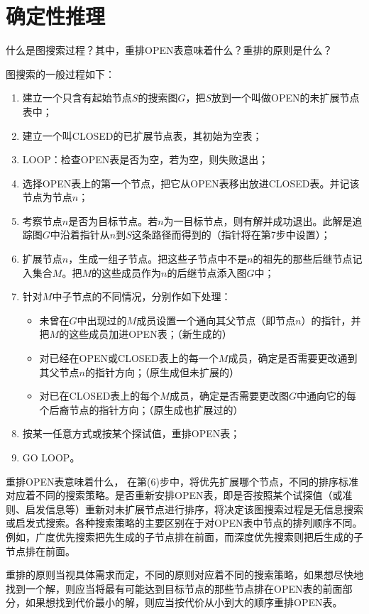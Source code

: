 \chapter{确定性推理}

\begin{question}
什么是图搜索过程？其中，重排OPEN表意味着什么？重排的原则是什么？
\end{question}	
\begin{solution}
图搜索的一般过程如下：
	\begin{enumerate}
		\item 建立一个只含有起始节点$S$的搜索图$G$，把$S$放到一个叫做OPEN的未扩展节点表中；
		\item 建立一个叫CLOSED的已扩展节点表，其初始为空表；
		\item LOOP：检查OPEN表是否为空，若为空，则失败退出；
		\item 选择OPEN表上的第一个节点，把它从OPEN表移出放进CLOSED表。并记该节点为节点$n$；
		\item 考察节点$n$是否为目标节点。若$n$为一目标节点，则有解并成功退出。此解是追踪图$G$中沿着指针从$n$到$S$这条路径而得到的（指针将在第7步中设置）；
		\item 扩展节点$n$，生成一组子节点。把这些子节点中不是$n$的祖先的那些后继节点记入集合$M$。把$M$的这些成员作为$n$的后继节点添入图$G$中；
		\item 针对$M$中子节点的不同情况，分别作如下处理：
			\begin{itemize}
				\item 未曾在$G$中出现过的$M$成员设置一个通向其父节点（即节点$n$）的指针，并把$M$的这些成员加进OPEN表；（新生成的）
				\item 对已经在OPEN或CLOSED表上的每一个$M$成员，确定是否需要更改通到其父节点$n$的指针方向；（原生成但未扩展的）
				\item 对已在CLOSED表上的每个$M$成员，确定是否需要更改图$G$中通向它的每个后裔节点的指针方向；（原生成也扩展过的）
			\end{itemize}
		\item 按某一任意方式或按某个探试值，重排OPEN表；
		\item GO LOOP。
	\end{enumerate} \par
重排OPEN表意味着什么， 在第(6)步中，将优先扩展哪个节点，不同的排序标准对应着不同的搜索策略。是否重新安排OPEN表，即是否按照某个试探值（或准则、启发信息等）重新对未扩展节点进行排序，将决定该图搜索过程是无信息搜索或启发式搜索。各种搜索策略的主要区别在于对OPEN表中节点的排列顺序不同。例如，广度优先搜索把先生成的子节点排在前面，而深度优先搜索则把后生成的子节点排在前面。\par
重排的原则当视具体需求而定，不同的原则对应着不同的搜索策略，如果想尽快地找到一个解，则应当将最有可能达到目标节点的那些节点排在OPEN表的前面部分，如果想找到代价最小的解，则应当按代价从小到大的顺序重排OPEN表。
\end{solution}

